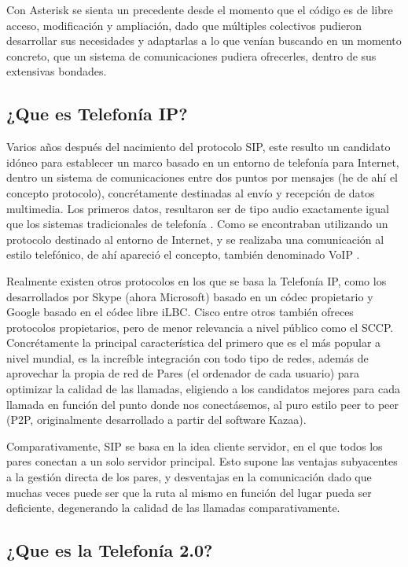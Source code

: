 Con Asterisk se sienta un precedente desde el momento que el código es de libre acceso, modificación y ampliación, dado que múltiples colectivos pudieron desarrollar sus necesidades y adaptarlas a lo que venían buscando en un momento concreto, que un sistema de comunicaciones pudiera ofrecerles, dentro de sus extensivas bondades. 

\subsection{¿Que es Telefonía IP?}

Varios años después del nacimiento del protocolo SIP, este resulto un candidato idóneo para establecer un marco basado en un entorno de telefonía para Internet, dentro un sistema de comunicaciones entre dos puntos por mensajes (he de ahí el concepto protocolo), concrétamente destinadas al envío y recepción de datos multimedia. Los primeros datos, resultaron ser de tipo audio exactamente igual que los sistemas tradicionales de telefonía \cite{perkins03}. Como se encontraban utilizando un protocolo destinado al entorno de Internet, y se realizaba una comunicación al estilo telefónico, de ahí apareció el concepto, también denominado VoIP \cite{wallingford05} \cite{website:voip}.

Realmente existen otros protocolos en los que se basa la Telefonía IP, como los desarrollados por Skype (ahora Microsoft) basado en un códec propietario y Google basado en el códec libre iLBC. Cisco entre otros también ofreces protocolos propietarios, pero de menor relevancia a nivel público como el SCCP. Concrétamente la principal característica del primero que es el más popular a nivel mundial, es la increíble integración con todo tipo de redes, además de aprovechar la propia de red de Pares (el ordenador de cada usuario) para optimizar la calidad de las llamadas, eligiendo a los candidatos mejores para cada llamada en función del punto donde nos conectásemos, al puro estilo peer to peer (P2P, originalmente desarrollado a partir del software Kazaa). 

Comparativamente, SIP se basa en la idea cliente servidor, en el que todos los pares conectan a un solo servidor principal. Esto supone las ventajas subyacentes a la gestión directa de los pares, y desventajas en la comunicación dado que muchas veces puede ser que la ruta al mismo en función del lugar pueda ser deficiente, degenerando la calidad de las llamadas comparativamente.

\subsection{¿Que es la Telefonía 2.0?}

